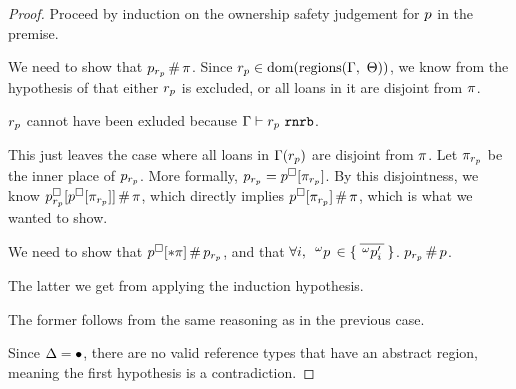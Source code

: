\begin{proof}
  Proceed by induction on the ownership safety judgement for $p$ in
  the premise.
 
  \vspace{1em}
  \noindent \framebox[\textwidth]{ \figuresize
    \begin{mathpar}
      \OSafePlace
    \end{mathpar}
  } \vspace{1em}

  We need to show that $p_{r_p} \, \# \, \pi$.
  Since $r_p \in \textrm{dom}(\textrm{regions}(\Gamma,\ \Theta))$, we know from the hypothesis of
   that either $r_p$ is excluded, or all loans in it
  are disjoint from $\pi$.

  $r_p$ cannot have been exluded because
  $\Gamma \vdash r_p \ \mathtt{rnrb}$.

  This just leaves the case where all loans in $\Gamma(r_p)$ are
  disjoint from $\pi$. Let $\pi_{r_p}$ be the inner place of
  $p_{r_p}$. More formally, $p_{r_p} =
  p^\square[\pi_{r_p}]$. By this disjointness, we know
  $p^\square_{r_p}[p^\square[\pi_{r_p}]] \, \# \, \pi$,
  which directly implies
  $p^\square[\pi_{r_p}] \, \# \, \pi$, which is what
  we wanted to show.
  
  \vspace{1em}
  \noindent \framebox[\textwidth]{ \figuresize
    \begin{mathpar}
      \ODeref
    \end{mathpar}
  } \vspace{1em}

  We need to show that $p^\square[* \pi] \, \# \, p_{r_p}$, and that $\forall i,
  \ \,^{\omega}p\, \in
  \{ \: \overline{\,^{\omega}p^\prime_i\,} \: \}$. $p_{r_p} \, \# \, p$.

  The latter we get from applying the induction hypothesis.

  The former follows from the same reasoning as in the previous case. 

  \vspace{1em}
  \noindent \framebox[\textwidth]{ \figuresize
    \begin{mathpar}
      \ODerefAbs
    \end{mathpar}
  } \vspace{1em}

  Since $\Delta = \bullet$, there are no valid reference types that have
  an abstract region, meaning the first hypothesis is a contradiction.
\end{proof}

